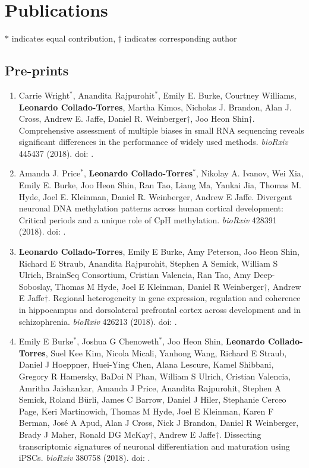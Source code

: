 \section{Publications}

$*$ indicates equal contribution, $\dagger$ indicates corresponding author

\subsection{Pre-prints}
    \begin{enumerate}
        \item Carrie Wright$^{*}$, Anandita Rajpurohit$^{*}$, Emily E. Burke, Courtney Williams, \textbf{Leonardo Collado-Torres}, Martha Kimos, Nicholas J. Brandon, Alan J. Cross, Andrew E. Jaffe, Daniel R. Weinberger$\dagger$, Joo Heon Shin$\dagger$. Comprehensive assessment of multiple biases in small RNA sequencing reveals significant differences in the performance of widely used methods. \emph{bioRxiv} 445437 (2018). doi: .
        
        \item Amanda J. Price$^{*}$, \textbf{Leonardo Collado-Torres}$^{*}$, Nikolay A. Ivanov, Wei Xia, Emily E. Burke, Joo Heon Shin, Ran Tao, Liang Ma, Yankai Jia, Thomas M. Hyde, Joel E. Kleinman, Daniel R. Weinberger, Andrew E Jaffe. Divergent neuronal DNA methylation patterns across human cortical development: Critical periods and a unique role of CpH methylation. \emph{bioRxiv} 428391 (2018). doi: .
        
        \item \textbf{Leonardo Collado-Torres}, Emily E Burke, Amy Peterson, Joo Heon Shin, Richard E Straub, Anandita Rajpurohit, Stephen A Semick, William S Ulrich, BrainSeq Consortium, Cristian Valencia, Ran Tao, Amy Deep-Soboslay, Thomas M Hyde, Joel E Kleinman, Daniel R Weinberger$\dagger$, Andrew E Jaffe$\dagger$. Regional heterogeneity in gene expression, regulation and coherence in hippocampus and dorsolateral prefrontal cortex across development and in schizophrenia. \emph{bioRxiv} 426213 (2018). doi: .
        
        \item Emily E Burke$^{*}$, Joshua G Chenoweth$^{*}$, Joo Heon Shin, \textbf{Leonardo Collado-Torres}, Suel Kee Kim, Nicola Micali, Yanhong Wang, Richard E Straub, Daniel J Hoeppner, Huei-Ying Chen, Alana Lescure, Kamel Shibbani, Gregory R Hamersky, BaDoi N Phan, William S Ulrich, Cristian Valencia, Amritha Jaishankar, Amanda J Price, Anandita Rajpurohit, Stephen A Semick, Roland Bürli, James C Barrow, Daniel J Hiler, Stephanie Cerceo Page, Keri Martinowich, Thomas M Hyde, Joel E Kleinman, Karen F Berman, José A Apud, Alan J Cross, Nick J Brandon, Daniel R Weinberger, Brady J Maher, Ronald DG McKay$\dagger$, Andrew E Jaffe$\dagger$. Dissecting transcriptomic signatures of neuronal differentiation and maturation using iPSCs. \emph{bioRxiv} 380758 (2018). doi: .
        

\end{enumerate}
